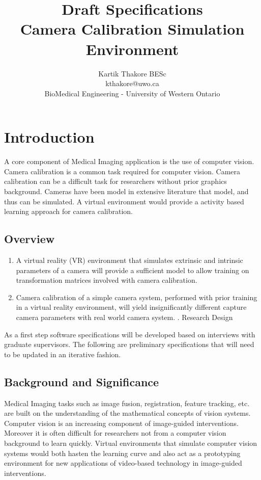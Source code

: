 \documentclass[11pt]{report}
\title{Draft Specifications\\Camera Calibration Simulation Environment}
\author{Kartik Thakore BESc\\
		kthakore@uwo.ca\\
		BioMedical Engineering - University of Western Ontario}
\date{}
\begin{document}
\maketitle

\chapter{Introduction}
  
A core component of Medical Imaging application is the use of computer vision. Camera calibration is a common task required for computer vision. Camera calibration can be a difficult task for researchers without prior graphics background. Cameras have been model in extensive literature that model, and thus can be simulated. A virtual environment would provide a activity based learning approach for camera calibration. 
     
\section{Overview}
     
\begin{enumerate}
\item A virtual reality (VR) environment that simulates extrinsic and intrinsic parameters of a camera will provide a sufficient model to allow training on transformation matrices involved with camera calibration.
\item Camera calibration of a simple camera system, performed with prior training in a virtual reality environment, will yield insignificantly different capture camera parameters with real world camera system. 
. Research Design
\end{enumerate}

As a first step software specifications will be developed based on interviews with graduate supervisors. The following are preliminary specifications that will need to be updated in an iterative fashion. 

\section{Background and Significance}

Medical Imaging tasks such as image fusion, registration, feature tracking, etc. are built on the understanding of the mathematical concepts of vision systems. Computer vision is an increasing component of image-guided interventions. Moreover it is often difficult for researchers not from a computer vision background to learn quickly. Virtual environments that simulate computer vision systems would both hasten the learning curve and also act as a prototyping environment for new applications of video-based technology in image-guided interventions. 
\end{document}
